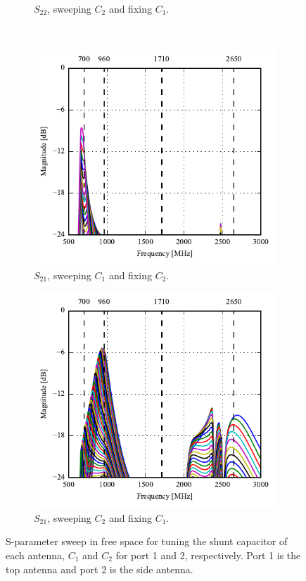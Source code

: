 \begin{figure}[htbp]
\begin{subfigure}[b]{0.49\linewidth}
        \caption{$S_{22}$, sweeping $C_2$ and fixing $C_1$.}
    \end{subfigure}
~
    \begin{subfigure}[b]{0.49\linewidth}
        \centering
        \includegraphics{img/tech_sol/monopole/highband/sim/s11_s21.pdf}
        \caption{$S_{21}$, sweeping $C_1$ and fixing $C_2$.}
    \end{subfigure}
    \hfill
    \begin{subfigure}[b]{0.49\linewidth}
        \centering
        \includegraphics{img/tech_sol/monopole/highband/sim/s22_s21.pdf}
        \caption{$S_{21}$, sweeping $C_2$ and fixing $C_1$.}
    \end{subfigure}
    \caption{S-parameter sweep in free space for tuning the shunt capacitor of each antenna, $C_1$ and $C_2$ for port 1 and 2, respectively. Port 1 is the top antenna and port 2 is the side antenna.}
    \label{fig:sparam_mono_modi_sim}
\end{figure}

